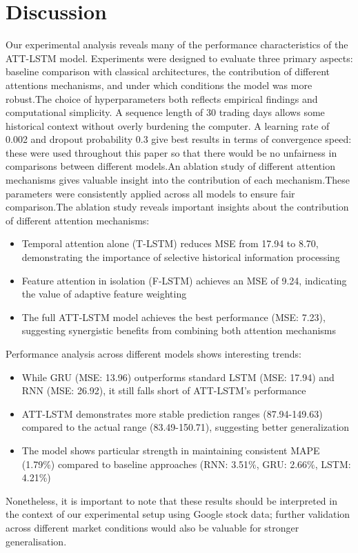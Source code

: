 \documentclass[10pt,twocolumn,letterpaper]{article}
\begin{document}
\section{Discussion}
Our experimental analysis reveals many of the performance characteristics of the ATT-LSTM model. Experiments were designed to evaluate three primary aspects: baseline comparison with classical architectures, the contribution of different attentions mechanisms, and under which conditions the model was more robust.The choice of hyperparameters both reflects empirical findings and computational simplicity. A sequence length of 30 trading days allows some historical context without overly burdening the computer. A learning rate of 0.002 and dropout probability 0.3 give best results in terms of convergence speed: these were used throughout this paper so that there would be no unfairness in comparisons between different models.An ablation study of different attention mechanisms gives valuable insight into the contribution of each mechanism.These parameters were consistently applied across all models to ensure fair comparison.The ablation study reveals important insights about the contribution of different attention mechanisms:
\begin{itemize}
	\item Temporal attention alone (T-LSTM) reduces MSE from 17.94 to 8.70, demonstrating the importance of selective historical information processing
	\item Feature attention in isolation (F-LSTM) achieves an MSE of 9.24, indicating the value of adaptive feature weighting
	\item The full ATT-LSTM model achieves the best performance (MSE: 7.23), suggesting synergistic benefits from combining both attention mechanisms
\end{itemize}
Performance analysis across different models shows interesting trends:
\begin{itemize}
	\item While GRU (MSE: 13.96) outperforms standard LSTM (MSE: 17.94) and RNN (MSE: 26.92), it still falls short of ATT-LSTM's performance
	\item ATT-LSTM demonstrates more stable prediction ranges (87.94-149.63) compared to the actual range (83.49-150.71), suggesting better generalization
	\item The model shows particular strength in maintaining consistent MAPE (1.79\%) compared to baseline approaches (RNN: 3.51\%, GRU: 2.66\%, LSTM: 4.21\%)
\end{itemize}
Nonetheless, it is important to note that these results should be interpreted in the context of our experimental setup using Google stock data; further validation across different market conditions would also be valuable for stronger generalisation.
\end{document}
